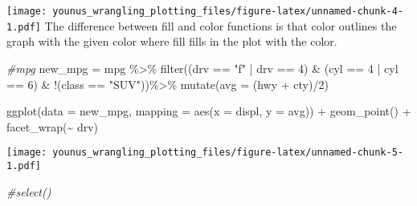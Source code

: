 \documentclass[
]{article}
\newenvironment{Shaded}{\begin{snugshade}}{\end{snugshade}}
\newcommand{\AttributeTok}[1]{\textcolor[rgb]{0.77,0.63,0.00}{#1}}
\newcommand{\CommentTok}[1]{\textcolor[rgb]{0.56,0.35,0.01}{\textit{#1}}}
\newcommand{\DecValTok}[1]{\textcolor[rgb]{0.00,0.00,0.81}{#1}}
\newcommand{\FunctionTok}[1]{\textcolor[rgb]{0.00,0.00,0.00}{#1}}
\newcommand{\NormalTok}[1]{#1}
\newcommand{\OtherTok}[1]{\textcolor[rgb]{0.56,0.35,0.01}{#1}}
\newcommand{\SpecialCharTok}[1]{\textcolor[rgb]{0.00,0.00,0.00}{#1}}
\newcommand{\StringTok}[1]{\textcolor[rgb]{0.31,0.60,0.02}{#1}}
\begin{document}
\texttt{[image: younus\_wrangling\_plotting\_files/figure-latex/unnamed-chunk-4-1.pdf]}
The difference between fill and color functions is that color outlines
the graph with the given color where fill fills in the plot with the
color.

\begin{Shaded}
\begin{Highlighting}[]
\CommentTok{\#mpg}
\NormalTok{new\_mpg }\OtherTok{=}\NormalTok{ mpg }\SpecialCharTok{\%\textgreater{}\%}
  \FunctionTok{filter}\NormalTok{((drv }\SpecialCharTok{==} \StringTok{"f"} \SpecialCharTok{|}\NormalTok{ drv }\SpecialCharTok{==} \DecValTok{4}\NormalTok{) }\SpecialCharTok{\&}\NormalTok{ (cyl }\SpecialCharTok{==} \DecValTok{4} \SpecialCharTok{|}\NormalTok{ cyl }\SpecialCharTok{==} \DecValTok{6}\NormalTok{) }\SpecialCharTok{\&} \SpecialCharTok{!}\NormalTok{(class }\SpecialCharTok{==} \StringTok{"SUV"}\NormalTok{))}\SpecialCharTok{\%\textgreater{}\%}
  \FunctionTok{mutate}\NormalTok{(}\AttributeTok{avg =}\NormalTok{ (hwy }\SpecialCharTok{+}\NormalTok{ cty)}\SpecialCharTok{/}\DecValTok{2}\NormalTok{)}


\FunctionTok{ggplot}\NormalTok{(}\AttributeTok{data =}\NormalTok{ new\_mpg, }\AttributeTok{mapping =} \FunctionTok{aes}\NormalTok{(}\AttributeTok{x =}\NormalTok{ displ, }\AttributeTok{y =}\NormalTok{ avg)) }\SpecialCharTok{+} 
  \FunctionTok{geom\_point}\NormalTok{() }\SpecialCharTok{+}
  \FunctionTok{facet\_wrap}\NormalTok{(}\SpecialCharTok{\textasciitilde{}}\NormalTok{ drv)}
\end{Highlighting}
\end{Shaded}

\texttt{[image: younus\_wrangling\_plotting\_files/figure-latex/unnamed-chunk-5-1.pdf]}

\begin{Shaded}
\begin{Highlighting}[]
  \CommentTok{\#select()}
\end{Highlighting}
\end{Shaded}
\end{document}
